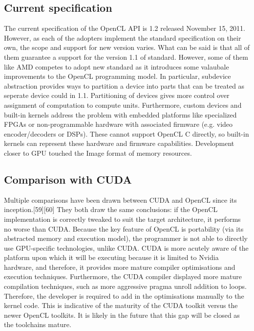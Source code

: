 



\subsection{Current specification}
The current specification of the OpenCL API is 1.2 released November 15, 2011. However, as each of the adopters implement the standard specification on their own, the scope and support for new version varies. What can be said is that all of them guarantee a support for the version 1.1 of standard. However, some of them like AMD competes to adopt new standard as it introduces some valaubale improvements to the OpenCL programming model. In particular, subdevice abstraction provides ways to partition a device into parts that can be treated as seperate device could in 1.1. Partitioning of devices gives more control over assignment of computation to compute units. Furthermore, custom devices and built-in kernels address the problem with embedded platforms like specialized FPGAs or non-programmable hardware with associated firmware (e.g. video encoder/decoders or DSPs). These cannot support OpenCL C directly, so built-in kernels can represent these hardware and firmware capabilities. Development closer to GPU touched the Image format of memory resources.



\subsection{Comparison with CUDA}


Multiple comparisons have been drawn between CUDA and OpenCL since its inception.[59][60] They both draw the same conclusions: if the OpenCL implementation is correctly tweaked to suit the target architecture, it performs no worse than CUDA. Because the key feature of OpenCL is portability (via its abstracted memory and execution model), the programmer is not able to directly use GPU-specific technologies, unlike CUDA. CUDA is more acutely aware of the platform upon which it will be executing because it is limited to Nvidia hardware, and therefore, it provides more mature compiler optimisations and execution techniques. Furthermore, the CUDA compiler displayed more mature compilation techniques, such as more aggressive pragma unroll addition to loops. Therefore, the developer is required to add in the optimisations manually to the kernel code. This is indicative of the maturity of the CUDA toolkit versus the newer OpenCL toolkits. It is likely in the future that this gap will be closed as the toolchains mature.

